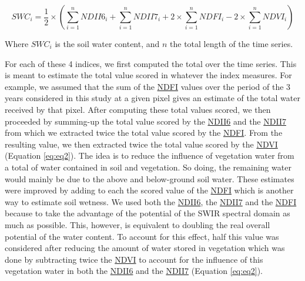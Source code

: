 \documentclass[12pt,oneside]{article}
\begin{document}
\begin{equation} 
SWC_i = \frac{1}{2}\times ( \sum_{i=1}^{n} NDII6_i + \sum_{i=1}^{n}NDII7_i + 2\times \sum_{i=1}^{n}NDFI_i - 2\times \sum_{i=1}^{n}NDVI_i )
\label{eq:eq2}
\end{equation}

Where \(SWC_i\) is the soil water content, and \(n\) the total length of the time series.

For each of these 4 indices, we first computed the total over the time series. This is meant to estimate the total value scored in whatever the index measures. For example, we assumed that the sum of the \href{http://journals.plos.org/plosone/article/file?id=10.1371/journal.pone.0088741\&type=printable}{NDFI} values over the period of the 3 years considered in this study at a given pixel gives an estimate of the total water received by that pixel. After computing these total values scored, we then proceeded by summing-up the total value scored by the \href{https://www.sciencedirect.com/science/article/pii/0034425789900461?via\%3Dihub}{NDII6} and the \href{https://www.sciencedirect.com/science/article/pii/0034425789900461?via\%3Dihub}{NDII7} from which we extracted twice the total value scored by the \href{http://journals.plos.org/plosone/article/file?id=10.1371/journal.pone.0088741\&type=printable}{NDFI}. From the resulting value, we then extracted twice the total value scored by the \href{https://www.sciencedirect.com/science/article/pii/0034425779900130?via\%3Dihub}{NDVI} (Equation \eqref{eq:eq2}). The idea is to reduce the influence of vegetation water from a total of water contained in soil and vegetation. So doing, the remaining water would mainly be due to the above and below-ground soil water. These estimates were improved by adding to each the scored value of the \href{http://journals.plos.org/plosone/article/file?id=10.1371/journal.pone.0088741\&type=printable}{NDFI} which is another way to estimate soil wetness. We used both the \href{https://www.sciencedirect.com/science/article/pii/0034425789900461?via\%3Dihub}{NDII6}, the \href{https://www.sciencedirect.com/science/article/pii/0034425789900461?via\%3Dihub}{NDII7} and the \href{http://journals.plos.org/plosone/article/file?id=10.1371/journal.pone.0088741\&type=printable}{NDFI} because to take the advantage of the potential of the SWIR spectral domain as much as possible. This, however, is equivalent to doubling the real overall potential of the water content. To account for this effect, half this value was considered after reducing the amount of water stored in vegetation which was done by subtracting twice the \href{https://www.sciencedirect.com/science/article/pii/0034425779900130?via\%3Dihub}{NDVI} to account for the influence of this vegetation water in both the \href{https://www.sciencedirect.com/science/article/pii/0034425789900461?via\%3Dihub}{NDII6} and the \href{https://www.sciencedirect.com/science/article/pii/0034425789900461?via\%3Dihub}{NDII7} (Equation \eqref{eq:eq2}).
\end{document}
